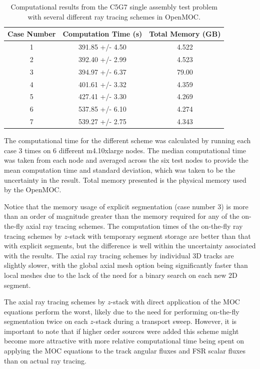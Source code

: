 \begin{table}[ht]
	\centering
	\caption{Computational results from the C5G7 single assembly test problem with several different ray tracing schemes in OpenMOC.}
	\begin{tabular}{ccc}
		\toprule
		\textbf{Case Number} & \textbf{Computation Time (s)} & \textbf{Total Memory (GB)} \\
		\midrule
		1  & 391.85 +/- 4.50 & 4.522 \\
		2  & 392.40 +/- 2.99 & 4.523 \\
		3  & 394.97 +/- 6.37 & 79.00 \\
		4  & 401.61 +/- 3.32 & 4.359 \\
		5  & 427.41 +/- 3.30 & 4.269 \\
		6  & 537.85 +/- 6.10 & 4.274 \\
		7  & 539.27 +/- 2.75 & 4.343 \\
		\bottomrule
	\end{tabular}
	\label{tab::performance_results}
\end{table}


The computational time for the different scheme was calculated by running each case 3 times on 6 different m4.10xlarge nodes. The median computational time was taken from each node and averaged across the six test nodes to provide the mean computation time and standard deviation, which was taken to be the uncertainty in the result. Total memory presented is the physical memory used by the OpenMOC.

Notice that the memory usage of explicit segmentation (case number 3) is more than an order of magnitude greater than the memory required for any of the on-the-fly axial ray tracing schemes. The computation times of the on-the-fly ray tracing schemes by $z$-stack with temporary segment storage are better than that with explicit segments, but the difference is well within the uncertainty associated with the results. The axial ray tracing schemes by individual 3D tracks are slightly slower, with the global axial mesh option being significantly faster than local meshes due to the lack of the need for a binary search on each new 2D segment. 

The axial ray tracing schemes by $z$-stack with direct application of the MOC equations perform the worst, likely due to the need for performing on-the-fly segmentation twice on each $z$-stack during a transport sweep. However, it is important to note that if higher order sources were added this scheme might become more attractive with more relative computational time being spent on applying the MOC equations to the track angular fluxes and FSR scalar fluxes than on actual ray tracing.

